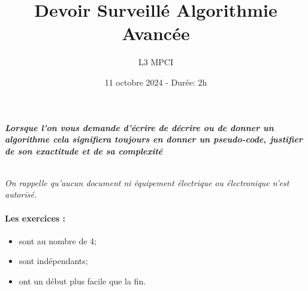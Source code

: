 \documentclass{article}
\title{Devoir Surveillé Algorithmie Avancée}
\author{L3 MPCI}
\date{11 octobre 2024 - Durée: 2h}
\theoremstyle{exostyle}
\theoremstyle{partiestyle}
\theoremstyle{questionstyle}
\begin{document}
\maketitle

\begin{center}
{\em\bf Lorsque l'on vous demande d'écrire de décrire ou de donner un algorithme cela signifiera toujours en donner un pseudo-code, justifier de son exactitude et de sa complexité}

~\\

{\em On rappelle qu'aucun document ni équipement électrique ou électronique n'est autorisé. }
\end{center}


\paragraph*{Les exercices :}
\begin{itemize}
\item sont au nombre de 4;
\item sont indépendants;
\item ont un début plus facile que la fin.
\end{itemize}

\clearpage
\end{document}

